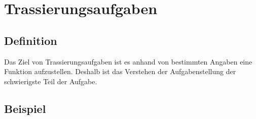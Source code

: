 \chapter{Trassierungsaufgaben}

\section{Definition}

\begin{flushleft}
    Das Ziel von Trassierungsaufgaben ist es anhand von bestimmten Angaben eine Funktion aufzustellen.
    Deshalb ist das Verstehen der Aufgabenstellung der schwierigste Teil der Aufgabe.
\end{flushleft}

\section{Beispiel}

